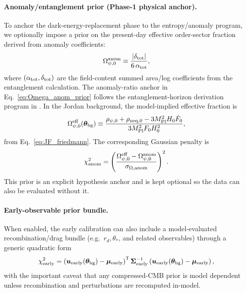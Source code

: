 \documentclass[10pt]{article}
\newcommand{\Mp}{M_{\mathrm{Pl}}}
\begin{document}
\paragraph{Anomaly/entanglement prior (Phase-1 physical anchor).}
To anchor the dark-energy-replacement phase to the entropy/anomaly program, we optionally impose a prior on the
present-day effective order-sector fraction derived from anomaly coefficients:
\begin{equation}
\Omega_{\psi,0}^{\rm anom}\equiv \frac{|\delta_{\rm tot}|}{6\,\alpha_{\rm tot}},
\label{eq:Omega_anom_prior}
\end{equation}
where \((\alpha_{\rm tot},\delta_{\rm tot})\) are the field-content summed area/log coefficients from the
entanglement calculation. The anomaly-ratio anchor in Eq.~\eqref{eq:Omega_anom_prior} follows the
entanglement-horizon derivation program in
\cite{MoonWalk2026PrecisionLatticeEntanglement,MoonWalk2026CosmologicalConstantEntanglement}.
In the Jordan background, the model-implied effective fraction is
\begin{equation}
\Omega_{\psi,0}^{\rm eff}(\bm{\theta}_{\rm bg})
\equiv
\frac{\rho_{\psi,0}+\rho_{{\rm neq},0}-3\Mp^2 H_0 \dot F_0}
{3\Mp^2 F_0 H_0^2},
\label{eq:Omega_psi_eff}
\end{equation}
from Eq.~\eqref{eq:JF_friedmann}. The corresponding Gaussian penalty is
\begin{equation}
\chi^2_{\rm anom}
=
\left(\frac{\Omega_{\psi,0}^{\rm eff}-\Omega_{\psi,0}^{\rm anom}}
{\sigma_{\Omega,\rm anom}}\right)^2.
\label{eq:chi2_anom}
\end{equation}
This prior is an explicit hypothesis anchor and is kept optional so the data can also be evaluated without it.

\paragraph{Early-observable prior bundle.}
When enabled, the early calibration can also include a model-evaluated recombination/drag bundle (e.g.\ \(r_d,\theta_\ast\), and
related observables) through a generic quadratic form
\begin{equation}
\chi^2_{\rm early}
=
\left(\bm{u}_{\rm early}(\bm{\theta}_{\rm bg})-\bm{\mu}_{\rm early}\right)^{\mathsf T}
\bm{\Sigma}_{\rm early}^{-1}
\left(\bm{u}_{\rm early}(\bm{\theta}_{\rm bg})-\bm{\mu}_{\rm early}\right),
\label{eq:chi2_early_bundle}
\end{equation}
with the important caveat that any compressed-CMB prior is model dependent unless recombination and perturbations are recomputed in-model.
\end{document}
